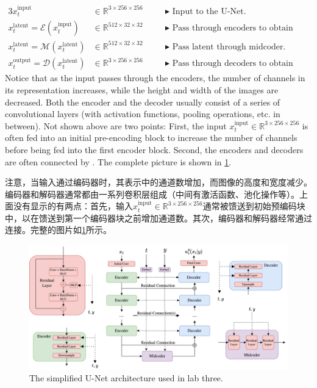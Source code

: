 \begin{alignat*}{3}
    x^{\text{input}}_t &\in \mathbb{R}^{3 \times 256 \times 256} \quad  
    && \blacktriangleright\,\,\text{Input to the U-Net.}\\
    x^{\text{latent}}_t = \mathcal{E}(x^{\text{input}}_t) &\in \mathbb{R}^{512 \times 32 \times 32} \quad && \blacktriangleright\,\,\text{Pass through encoders to obtain latent.}\\
    x^{\text{latent}}_t = \mathcal{M}(x^{\text{latent}}_t) &\in \mathbb{R}^{512 \times 32 \times 32} \quad && \blacktriangleright\,\,\text{Pass latent through midcoder.}\\
    x^{\text{output}}_t = \mathcal{D}(x^{\text{latent}}_t) &\in \mathbb{R}^{3 \times 256 \times 256} \quad && \blacktriangleright\,\,\text{Pass through decoders to obtain output.}
\end{alignat*}
Notice that as the input passes through the encoders, the number of channels in its representation increases, while the height and width of the images are decreased. Both the encoder and the decoder usually consist of a series of convolutional layers (with activation functions, pooling operations, etc. in between). Not shown above are two points: First, the input $x^{\text{input}}_t\in \mathbb{R}^{3 \times 256 \times 256}$ is often fed into an initial pre-encoding block to increase the number of channels before being fed into the first encoder block. Second, the encoders and decoders are often connected by . The complete picture is shown in \cref{fig:unet}.

注意，当输入通过编码器时，其表示中的通道数增加，而图像的高度和宽度减少。编码器和解码器通常都由一系列卷积层组成（中间有激活函数、池化操作等）。上面没有显示的有两点：首先，输入$x^{\text{input}}_t\in \mathbb{R}^{3 \times 256 \times 256}$通常被馈送到初始预编码块中，以在馈送到第一个编码器块之前增加通道数。其次，编码器和解码器经常通过连接。完整的图片如\cref{fig:unet}所示。

\begin{figure}
    \centering
    \includegraphics[width=\textwidth]{figures/unet.png}
    \caption{The simplified U-Net architecture used in lab three.}
    \label{fig:unet}
\end{figure}


